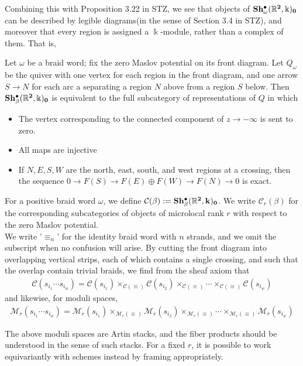 Combining this with Proposition 3.22 in STZ, we see that objects of $\bf{Sh^{\bullet}_{\omega}}(\mathbb{R}^2,\Bbbk)_0$ can be described by legible diagrams(in the sense of Section 3.4 in STZ), and moreover that every region is assigned a $\Bbbk$-module, rather than a complex of them. That is,
\begin{proposition}
Let $\omega$ be a braid word; fix the zero Maslov potential on its front diagram. Let $Q_{\omega}$ be the quiver with one vertex for each region in the front diagram, and one arrow $S\rightarrow N$ for each arc a separating a region $N$ above from a region $S$ below. Then $\bf{Sh^{\bullet}_{\beta}}(\mathbb{R}^2,\Bbbk)_0$ is equivalent to the full subcategory of representations of $Q$ in which
\begin{itemize}
\item The vertex corresponding to the connected component of $z\rightarrow -\infty$ is sent to zero.
\item All maps are injective
\item If $N,E,S,W$ are the north, east, south, and west regions at a crossing, then the sequence $0\rightarrow F(S)\rightarrow F(E)\oplus F(W)\rightarrow F(N)\rightarrow 0$ is exact.
\end{itemize}
\end{proposition}
For a positive braid word $\omega$, we define $\mathcal{C}(\beta):=\bf{Sh^{\bullet}_{\beta}}(\mathbb{R}^2,k)_0$. We write $\mathcal{C}_r(\beta)$ for the corresponding subcategories of objects of microlocal rank $r$ with respect to the zero Maslov potential.\\
We write '$\equiv_n$' for the identity braid word with $n$ strands, and we omit the subscript when no confusion will arise. By cutting the front diagram into overlapping vertical strips, each of which contains a single crossing, and such that the overlap contain trivial braids, we find from the sheaf axiom that 
\begin{align}
	\mathcal{C}(s_{i_1}\cdots s_{i_w})=\mathcal{C}(s_{i_1})\times_{\mathcal{C}(\equiv)}\mathcal{C}(s_{i_2})\times_{\mathcal{C}(\equiv)}\cdots\times_{\mathcal{C}(\equiv)}\mathcal{C}(s_{i_w})
\end{align}
and likewise, for moduli spaces,
\begin{align}
	\mathcal{M}_r(s_{i_1}\cdots s_{i_w})=\mathcal{M}_r(s_{i_1})\times_{\mathcal{M}_r(\equiv)}\mathcal{M}_r(s_{i_2})\times_{\mathcal{M}_r(\equiv)}\cdots\times_{\mathcal{M}_r(\equiv)}\mathcal{M}_r(s_{i_w})
\end{align}
\begin{remark}
		The above moduli spaces are Artin stacks, and the fiber products should be understood in the sense of such stacks. For a fixed $r$, it is possible to work equivariantly with schemes instead by framing appropriately.
\end{remark}
